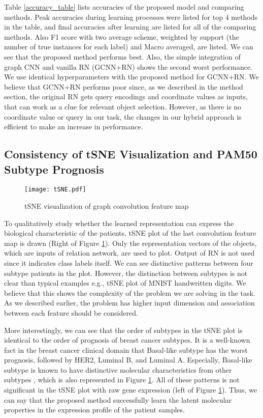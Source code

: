 \documentclass{article}
\begin{document}
Table \ref{accuracy_table} lists accuracies of the proposed model and comparing methods. Peak accuracies during learning processes were listed for top 4 methods in the table, and final accuracies after learning are listed for all of the comparing methods. Also F1 score with two average scheme, weighted by support (the number of true instances for each label) and Macro averaged, are listed. We can see that the proposed method performs best. Also, the simple integration of graph CNN and vanilla RN (GCNN+RN) shows the second worst performance. We use identical hyperparameters with the proposed method for GCNN+RN. We believe that GCNN+RN performs poor since, as we described in the method section, the original RN gets query encodings and coordinate values as inputs, that can work as a clue for relevant object selection. However, as there is no coordinate value or query in our task, the changes in our hybrid approach is efficient to make an increase in performance. 

\subsection{Consistency of tSNE Visualization and PAM50 Subtype Prognosis}

\begin{figure}[!t]
\centering
\texttt{[image: tSNE.pdf]}
\caption{tSNE visualization of graph convolution feature map}
\label{fig_tSNE}
\end{figure}

To qualitatively study whether the learned representation can express the biological characteristic of the patients, tSNE plot \cite{maaten2008visualizing} of the last convolution feature map is drawn (Right of Figure \ref{fig_tSNE}). Only the representation vectors of the objects, which are inputs of relation network, are used to plot. Output of RN is not used since it indicates class labels itself. We can see distinctive patterns between four subtype patients in the plot. However, the distinction between subtypes is not clear than typical examples e.g., tSNE plot of MNIST handwritten digits. We believe that this shows the complexity of the problem we are solving in the task. As we described earlier, the problem has higher input dimension and association between each feature should be considered.

More interestingly, we can see that the order of subtypes in the tSNE plot is identical to the order of prognosis of breast cancer subtypes. It is a well-known fact in the breast cancer clinical domain that Basal-like subtype has the worst prognosis, followed by HER2, Luminal B, and Luminal A. Especially, Basal-like subtype is known to have distinctive molecular characteristics from other subtypes \cite{bertucci2012basal}, which is also represented in Figure \ref{fig_tSNE}. All of these patterns is not significant in the tSNE plot with raw gene expression (left of Figure \ref{fig_tSNE}). Thus, we can say that the proposed method successfully learn the latent molecular properties in the expression profile of the patient samples.  
\end{document}
